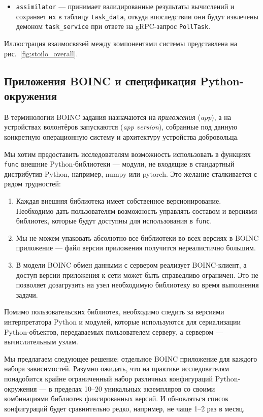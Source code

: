 \documentclass[a4paper,12pt]{extarticle}
\begin{document}
\begin{itemize}
    \item \texttt{assimilator} — принимает валидированные результаты вычислений и сохраняет их в таблицу \texttt{task\_data}, откуда впоследствии они будут извлечены демоном \texttt{task\_service} при ответе на gRPC-запрос \texttt{PollTask}.
\end{itemize}

Иллюстрация взаимосвязей между компонентами системы представлена на рис.~\ref{fig:stoilo_overall}.

\subsection{Приложения BOINC и спецификация Python-окружения}\label{sec:flavor}

В терминологии BOINC задания назначаются на \textit{приложения} (\textit{app}), а на устройствах волонтёров запускаются  (\textit{app version}), собранные под данную конкретную операционную систему и архитектуру устройства добровольца.

Мы хотим предоставить исследователям возможность использовать в функциях \texttt{func} внешние Python-библиотеки — модули, не входящие в стандартный дистрибутив Python, например, numpy или pytorch.
Это желание сталкивается с рядом трудностей:
\begin{enumerate}
    \item[1.] Каждая внешняя библиотека имеет собственное версионирование.
    Необходимо дать пользователям возможность управлять составом и версиями библиотек, которые будут доступны для использования в \texttt{func}.
    \item[2.] Мы не можем упаковать абсолютно все библиотеки во всех версиях в BOINC приложение — файл версии приложения получится нереалистично большим.
    \item[3.] В модели BOINC обмен данными с сервером реализует BOINC-клиент, а доступ версии приложения к сети может быть справедливо ограничен.
    Это не позволяет дозагрузить на узел необходимую библиотеку во время выполнения задачи.
\end{enumerate}

Помимо пользовательских библиотек, необходимо следить за версиями интерпретатора Python и модулей, которые используются для сериализации Python-объектов, передаваемых пользователем серверу, а сервером — вычислительным узлам.

Мы предлагаем следующее решение:
отдельное BOINC приложение для каждого набора зависимостей.
Разумно ожидать, что на практике исследователям понадобится крайне ограниченный набор различных конфигураций Python-окружения — в пределах 10--20 уникальных экземпляров со своими комбинациями библиотек фиксированных версий.
И обновляться список конфигураций будет сравнительно редко, например, не чаще 1--2 раз в месяц.
\end{document}
